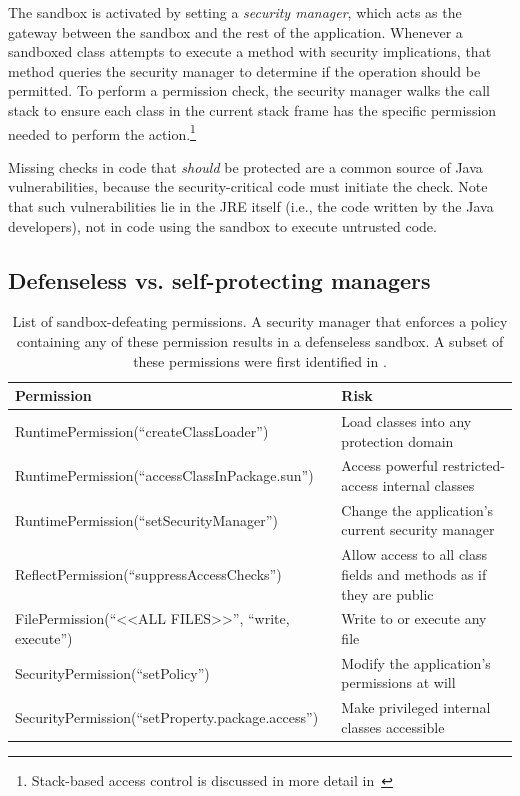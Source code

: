 \documentclass{sig-alternate-05-2015}
\begin{document}
The sandbox is activated by setting a \emph{security manager}, which acts as the
gateway between the sandbox and the rest of the application. Whenever a
sandboxed class attempts to execute a method with security implications, that
method queries the security manager to determine if the operation should be
permitted. 
To perform a permission check, the security manager walks the call stack to
ensure each class in the current stack frame has the specific permission needed to
perform the action.\footnote{Stack-based access control is discussed in more
  detail
  in~\cite{banerjee_stack-based_2005,besson_stack_2004,d._s._wallach_understanding_1998,fournet_stack_2002}}

Missing checks in code that \emph{should} be protected are a common
source of Java vulnerabilities, because the security-critical code must initiate
the check.  Note that such vulnerabilities lie in the JRE itself (i.e., the code
written by the Java developers), not in code using the sandbox to
execute untrusted code.

\subsection{Defenseless vs. self-protecting managers}
\label{sec:secmanagers}

\begin{table}
\caption{List of sandbox-defeating permissions. A security manager that enforces
a policy containing any of these permission results
\label{tab:defenseless-permissions}
in a defenseless sandbox. A subset of these permissions were first identified in \cite{security_explorations_2012}. 
}
\begin{tabular}{ll}
\toprule 
\textbf{Permission} & \textbf{Risk}\tabularnewline
\midrule
RuntimePermission(``createClassLoader'') & Load classes into any protection domain\tabularnewline
RuntimePermission(``accessClassInPackage.sun'') & Access powerful restricted-access internal classes\tabularnewline
RuntimePermission(``setSecurityManager'') & Change the application's current security manager\tabularnewline
ReflectPermission(``suppressAccessChecks'') & Allow access to all class fields and methods as if they are public\tabularnewline
FilePermission(``<\textcompwordmark{}<ALL FILES>\textcompwordmark{}>'',
``write, execute'') & Write to or execute any file\tabularnewline
SecurityPermission(``setPolicy'') & Modify the application's permissions at will\tabularnewline
SecurityPermission(``setProperty.package.access'') & Make privileged internal classes accessible\tabularnewline
\bottomrule
\end{tabular}
\vspace{-0.5cm}
\end{table}
\end{document}
